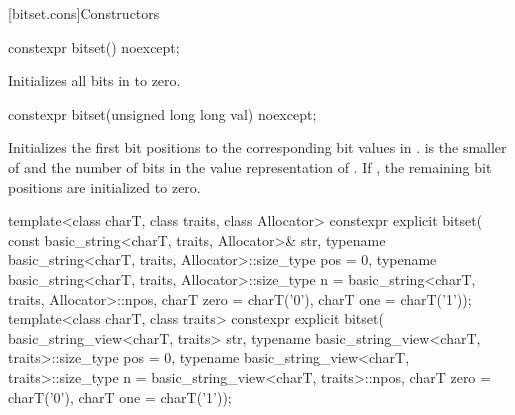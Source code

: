 [bitset.cons]{Constructors}

%
\begin{itemdecl}
constexpr bitset() noexcept;
\end{itemdecl}

\begin{itemdescr}
\pnum
\effects
Initializes all bits in  to zero.
\end{itemdescr}

%
\begin{itemdecl}
constexpr bitset(unsigned long long val) noexcept;
\end{itemdecl}

\begin{itemdescr}
\pnum
\effects
Initializes the first  bit positions to the corresponding bit
values in .
 is the smaller of  and the number of bits in the value
representation of .
If , the remaining bit positions are initialized to zero.
\end{itemdescr}

%
\begin{itemdecl}
template<class charT, class traits, class Allocator>
  constexpr explicit bitset(
    const basic_string<charT, traits, Allocator>& str,
    typename basic_string<charT, traits, Allocator>::size_type pos = 0,
    typename basic_string<charT, traits, Allocator>::size_type n
      = basic_string<charT, traits, Allocator>::npos,
    charT zero = charT('0'),
    charT one = charT('1'));
template<class charT, class traits>
  constexpr explicit bitset(
    basic_string_view<charT, traits> str,
    typename basic_string_view<charT, traits>::size_type pos = 0,
    typename basic_string_view<charT, traits>::size_type n
      = basic_string_view<charT, traits>::npos,
    charT zero = charT('0'),
    charT one = charT('1'));
\end{itemdecl}

